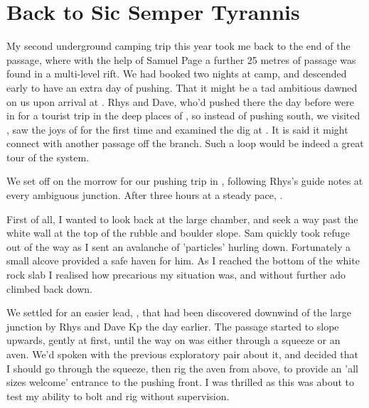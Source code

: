 \section{Back to Sic Semper Tyrannis}
My second underground camping trip this year took me back to the end of the  passage, where with the help of Samuel Page a further 25 metres of passage was found in a multi-level rift. We had booked two nights at camp, and descended early to have an extra day of pushing. That it might be a tad ambitious dawned on us upon arrival at . Rhys and Dave, who'd pushed there the day before were in for a tourist trip in the deep places of , so instead of pushing south, we visited , saw the joys of  for the first time and examined the dig at . It is said it might connect with another passage off the  branch. Such a loop would be indeed a great tour of the system.


We set off on the morrow for our pushing trip in , following Rhys's guide notes at every ambiguous junction. After three hours at a steady pace, .


First of all, I wanted to look back at the large  chamber, and seek a way past the white wall at the top of the rubble and boulder slope. Sam quickly took refuge out of the way as I sent an avalanche of 'particles' hurling down. Fortunately a small alcove provided a safe haven for him. As I reached the bottom of the white rock slab I realised how precarious my situation was, and without further ado climbed back down.

We settled for an easier lead, , that had been discovered downwind of the large junction by Rhys and Dave Kp the day earlier. The passage started to slope upwards, gently at first, until the way on was either through a squeeze or an aven. We'd spoken with the previous exploratory pair about it, and decided that I should go through the squeeze, then rig the aven from above, to provide an 'all sizes welcome' entrance to the pushing front. I was thrilled as this was about to test my ability to bolt and rig without supervision.

